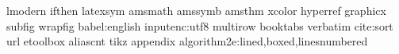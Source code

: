 lmodern
ifthen
latexsym
amsmath
amssymb
amsthm
xcolor
hyperref
graphicx
subfig
wrapfig
babel:english
inputenc:utf8
multirow
booktabs
verbatim
cite:sort
url
etoolbox
aliascnt
tikz
appendix
algorithm2e:lined,boxed,linesnumbered

